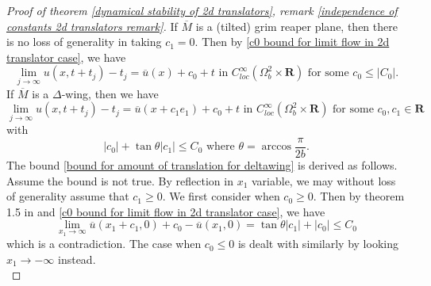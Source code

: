 \documentclass[pdflatex,sn-mathphys-num]{sn-jnl}%
\begin{document}
\begin{proof}[Proof of theorem \ref{dynamical stability of 2d translators}, remark \ref{independence of constants 2d translators remark}]
If $\overline{M}$ is a (tilted) grim reaper plane, then there is no loss of generality in taking $c_1 = 0$. Then by \eqref{c0 bound for limit flow in 2d translator case}, we have
\begin{equation}\label{subconvergence2dgrimreaperplane}
    \lim_{j\to \infty}u(x, t+t_j) - t_j = \overline{u}(x) + c_0 +t\text{ in }C^{\infty}_{loc}(\Omega^2_b\times \mathbf{R}) \text{ for some }c_0 \leq |C_0|.
\end{equation}
If $\overline{M}$ is a $\Delta$-wing, then we have
\begin{equation}\label{subconvergence2ddeltawing}
    \lim_{j\to \infty}u(x, t+t_j) - t_j = \overline{u}(x + c_1e_1) + c_0 +t\text{ in }C^{\infty}_{loc}(\Omega^2_b\times \mathbf{R}) \text{ for some }c_0, c_1 \in \mathbf{R}
\end{equation}
with
\begin{equation}\label{bound for amount of translation for deltawing}
    |c_0| + \tan\theta|c_1| \leq C_0 \text{ where }\theta = \arccos\frac{\pi}{2b}.
\end{equation}
The bound \eqref{bound for amount of translation for deltawing} is derived as follows. Assume the bound is not true. By reflection in $x_1$ variable, we may without loss of generality assume that $c_1 \geq 0$. We first consider when $c_0 \geq 0$. Then by theorem 1.5 in \cite{spruck2020complete} and \eqref{c0 bound for limit flow in 2d translator case}, we have
\begin{equation}
    \lim_{x_1 \to \infty}\overline{u}(x_1 + c_1, 0) + c_0 - \overline{u}(x_1, 0) = \tan\theta |c_1| + |c_0| \leq C_0
\end{equation}
which is a contradiction. The case when $c_0 \leq 0$ is dealt with similarly by looking $x_1 \to -\infty$ instead.\\


\end{proof}
\end{document}
